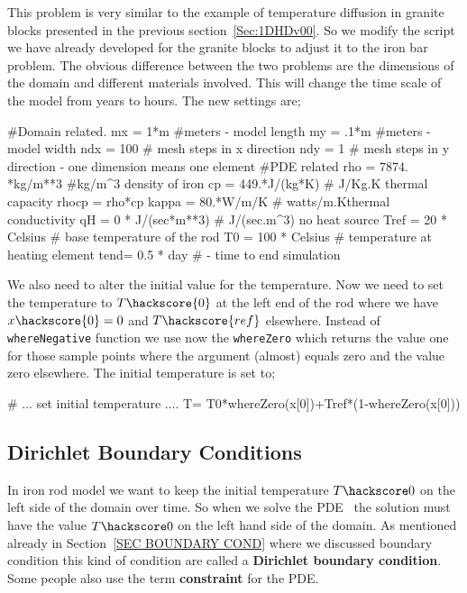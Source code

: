 This problem is very similar to the example of temperature diffusion in granite blocks presented in the previous section~\ref{Sec:1DHDv00}. So we modify the script we have already developed for the granite blocks to adjust 
it to the iron bar problem.  
The obvious difference between the two problems are the dimensions of the domain and different materials involved. This will change the time scale of the model from years to hours. 
The new settings are;
\begin{python}
#Domain related.
mx = 1*m #meters - model length
my = .1*m #meters - model width
ndx = 100 # mesh steps in x direction 
ndy = 1 # mesh steps in y direction - one dimension means one element
#PDE related
rho = 7874. *kg/m**3 #kg/m^{3} density of iron
cp = 449.*J/(kg*K) # J/Kg.K thermal capacity
rhocp = rho*cp 
kappa = 80.*W/m/K   # watts/m.Kthermal conductivity
qH = 0 * J/(sec*m**3) # J/(sec.m^{3}) no heat source
Tref = 20 * Celsius  # base temperature of the rod
T0 = 100 * Celsius # temperature at heating element
tend= 0.5 * day # - time to end simulation
\end{python}
We also need to alter the initial value for the temperature. Now we need to set the 
temperature to $T\hackscore{0}$ at the left end of the rod where we have $x\hackscore{0}=0$ and 
$T\hackscore{ref}$ elsewhere. Instead of \verb|whereNegative| function we use now the 
\verb|whereZero| which returns the value one for those sample points where 
the argument (almost) equals zero and the value zero elsewhere. The initial
temperature is set to;
\begin{python}
# ... set initial temperature ....
T= T0*whereZero(x[0])+Tref*(1-whereZero(x[0]))
\end{python}

\subsection{Dirichlet Boundary Conditions}
In iron rod model  we want to keep the initial temperature $T\hackscore0$ on the left side of the domain over time. 
So when we solve the PDE~ the solution must have the value $T\hackscore0$ on the left hand
side of the domain. As mentioned already in Section~\ref{SEC BOUNDARY COND} where we discussed
boundary condition this kind of condition are called a \textbf{Dirichlet boundary condition}. Some people also
use the term \textbf{constraint} for the PDE. 

